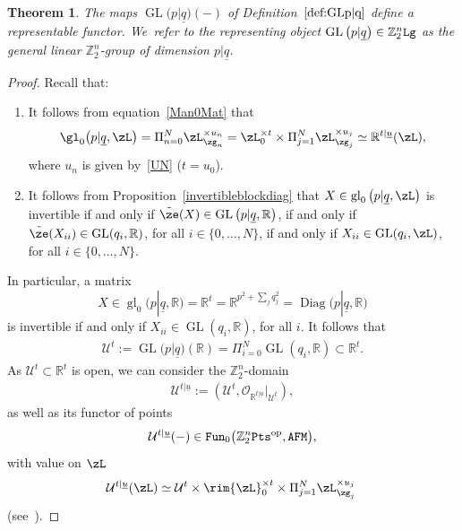 \documentclass[pdftex]{sigma}%
\newcommand{\op}[1]{\operatorname{#1}}
\newcommand{\R}{{\mathbb R}}
\newcommand{\Z}{{\mathbb Z}}
\def\ul{\underline}
\def\cO{\mathcal{O}}
\def\cU{\mathcal{U}}
\def\ul{\underline}
\newcommand{\0}{\otimes}
\newcommand{\z}{\Z_2^n}
\numberwithin{equation}{section}
\newtheorem{Theorem}{Theorem}[section]
\begin{document}
\begin{Theorem}\label{thm:GLRep}
The maps $\op{GL}\big(p|\ul q\big)(-)$ of Definition~$\ref{def:GLp|q}$ define a representable functor. We~refer to the representing object $\op{GL}\big(p|\ul q\big)\in\z{\tt Lg}$ as the \emph{general linear $\z$-group of dimension} $p|\ul q$. \end{Theorem}

\begin{proof}

Recall that:
\begin{enumerate}\itemsep=0pt
\item
It follows from equation~\eqref{Man0Mat} that
\[
\gl_0\big(p|\ul{q},\zL\big)=\Pi_{n=0}^N\zL_{\zg_n}^{\times u_n}=\zL_0^{\times t}\times \Pi_{j=1}^N \zL_{\zg_j}^{\times u_j}\simeq\R^{t|\ul u}(\zL),
\]
 where $u_n$ is given by~\eqref{UN} ($t=u_0$).

\item
It follows from Proposition~\ref{invertibleblockdiag} that $X\in\op{gl}_0\big(p|\ul q,\zL\big)$ is invertible if and only if $\tilde{\ze}(X)\in\op{GL}\big(p|\ul q,\R\big)$, if and only if $\tilde{\ze}(X_{ii})\in\op{GL}(q_i,\R)$, for all $i\in\{0,\dots, N\}$, if and only if $X_{ii}\in\op{GL}(q_i,\zL)$, for all $i\in\{0,\dots, N\}$.\end{enumerate}

In particular, a matrix
\[
X\in\op{gl}_0\big(p|\ul q,\R\big)=\R^t=\R^{p^2+\sum_jq_j^2}=\op{Diag}\big(p|\ul q,\R\big)
\]
is invertible if and only if $X_{ii}\in\op{GL}(q_i,\R)$, for all $i$. It follows that \begin{gather}\label{GL1}
\cU^t:=\op{GL}\big(p|\ul q\big)(\R)=\Pi_{i=0}^N\op{GL}(q_i,\R)\subset \R^t.
\end{gather}
As $\cU^t\subset\R^t$ is open, we can consider the $\z$-domain
\begin{gather}\label{GL2}
\cU^{t|\ul u}:=(\cU^t,\cO_{\R^{t|\ul u}}|_{\cU^t}),
\end{gather}
as well as its functor of points
\[
\cU^{t|\ul u}(-)\in{\tt Fun}_0\big(\z{\tt Pts}^{\op{op}},{\tt AFM}\big),
\]
with value on $\zL$
\[
\cU^{t|\ul u}(\zL)\simeq\cU^t\times\rim{\zL}^{\times t}_0\times\Pi_{j=1}^N\zL_{\zg_j}^{\times u_j}\;
\]
(see~\cite{Bruce:2019b}).


\end{proof}
\end{document}

